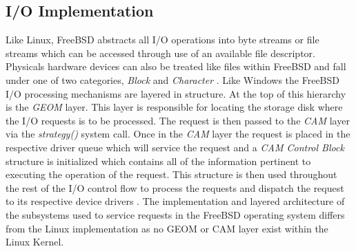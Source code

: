   \subsection{\bf I/O Implementation} 
    \normalfont \indent Like Linux, FreeBSD abstracts all I/O operations into byte streams or file streams which can be accessed through use of an available file descriptor. Physicals hardware devices can also be treated like files within FreeBSD and fall under one of two categories, \textit{Block} and \textit{Character} \cite{FreeBSDDesign}. Like Windows the FreeBSD I/O processing mechanisms are layered in structure. At the top of this hierarchy is the \textit{GEOM} layer. This layer is responsible for locating the storage disk where the I/O requests is to be processed. The request is then passed to the \textit{CAM} layer via the \textit{strategy()} system call. Once in the \textit{CAM} layer the request is placed in the respective driver queue which will service the request and a \textit{CAM Control Block} structure is initialized which contains all of the information pertinent to executing the operation of the request. This structure is then used throughout the rest of the I/O control flow to process the requests and dispatch the request to its respective device drivers \cite{FreeBSD}. The implementation and layered architecture of the subsystems used to service requests in the FreeBSD operating system differs from the Linux implementation as no GEOM or CAM layer exist within the Linux Kernel. 
